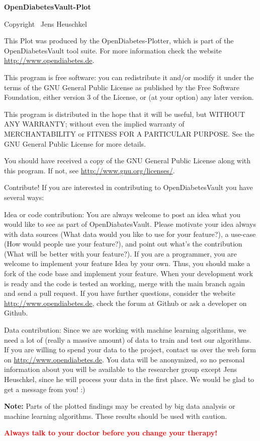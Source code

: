 \centerline{\huge\textbf{OpenDiabetesVault-Plot}} 
\vspace{2em}

\begin{changemargin}{4em}{4em} 

Copyright \textcopyright ~\the\year Jens Heuschkel
\vspace{1em}

This Plot was produced by the OpenDiabetes-Plotter, which is part of the OpenDiabetesVault tool suite.
For more information check the website \url{http://www.opendiabetes.de}.

This program is free software: you can redistribute it and/or modify
it under the terms of the GNU General Public License as published by
the Free Software Foundation, either version 3 of the License, or
(at your option) any later version.

This program is distributed in the hope that it will be useful,
but WITHOUT ANY WARRANTY; without even the implied warranty of
MERCHANTABILITY or FITNESS FOR A PARTICULAR PURPOSE.  See the
GNU General Public License for more details.

You should have received a copy of the GNU General Public License
along with this program.  If not, see \url{http://www.gnu.org/licenses/}.
\vspace{1em}

Contribute!
If you are interested in contributing to OpenDiabetesVault you have several ways:

Idea or code contribution: 
You are always welcome to post an idea what you would like to see as part of OpenDiabatesVault.
Please motivate your idea always with data sources (What data would you like to use for your feature?), 
a use-case (How would people use your feature?), 
and point out what's the contribution (What will be better with your feature?).
If you are a programmer, you are welcome to implement your feature Idea by your own.
Thus, you should make a fork of the code base and implement your feature.
When your development work is ready and the code is tested an working, merge with the main branch again and send a pull request.
If you have further questions, consider the website \url{http://www.opendiabetes.de}, check the forum at Github or ask a developer on Github.

Data contribution:
Since we are working with machine learning algorithms, we need a lot of (really a massive amount) of data to train and test our algorithms.
If you are willing to spend your data to the project, contact us over the web form on \url{http://www.opendiabetes.de}.
You data will be anonymized, so no personal information about you will be available to the researcher group except Jens Heuschkel, since he will process your data in the first place.
We would be glad to get a message from you! :)
\vspace{1em}

\textbf{Note:} Parts of the plotted findings may be created by big data analysis or machine learning algorithms.
These results should be used with caution.

\textcolor{red}{\textbf{Always talk to your doctor before you change your therapy!}}

\end{changemargin}


